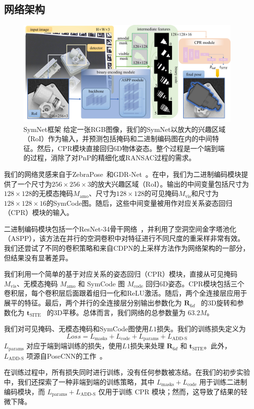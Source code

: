 \subsection{网络架构}
\begin{figure}[t]
    \centerline{\includegraphics[width=1.0\textwidth]{figure/symnet/network.jpg}}
    \caption{SymNet框架 给定一张RGB图像，我们的SymNet以放大的兴趣区域（RoI）作为输入，并预测包括掩码和二进制编码图在内的中间特征。然后，CPR模块直接回归6D物体姿态。整个过程是一个端到端的过程，消除了对PnP的精细化或RANSAC过程的需求。}
    \label{fig:network}
\end{figure}

我们的网络灵感来自于ZebraPose~\cite{su2022zebrapose}和GDR-Net~\cite{wang2021gdr}。在中，我们为二进制编码模块提供了一个尺寸为$256 \times 256 \times 3$的放大兴趣区域（RoI）。输出的中间变量包括尺寸为$128 \times 128$的无模态掩码$M_{\text{amo}}$、尺寸为$128 \times 128$的可见掩码$M_\text{{vis}}$和尺寸为$128 \times 128 \times 16$的SymCode图。随后，这些中间变量被用作对应关系姿态回归（CPR）模块的输入。

二进制编码模块包括一个ResNet-34骨干网络~\cite{he2016resnet}，并利用了空洞空间金字塔池化（ASPP）\cite{chen2017deeplabv3}，该方法在并行的空洞卷积中对特征进行不同尺度的重采样非常有效。我们还尝试了不同的卷积策略和来自CDPN\cite{li2019cdpn}的上采样方法作为网络架构的一部分，但结果没有显著差异。

我们利用一个简单的基于对应关系的姿态回归（CPR）模块，直接从可见掩码 $M_\text{{vis}}$、无模态掩码 $M_{\text{amo}}$ 和 SymCode 图 $M_\text{code}$ 回归6D姿态。CPR模块包括三个卷积层，每个卷积层后面跟着组归一化和ReLU激活。随后，两个全连接层应用于展平的特征。最后，两个并行的全连接层分别输出参数化为 $\mathbf{R}_{6d}$~\cite{zhou2019continuity} 的3D旋转和参数化为 $\mathbf{t}_\text{SITE}$~\cite{li2019cdpn} 的3D平移。总体而言，我们网络的总参数量为 $63.2M$。

我们对可见掩码、无模态掩码和SymCode图使用$L1$损失。我们的训练损失定义为
\begin{equation}
    Loss = L_\text{masks} + L_\text{code} + L_\text{params} + L_\text{ADD-S}
\end{equation}
$L_\text{params}$ 对应于端到端训练的损失，使用$L1$损失来处理 $\mathbf{R}_{6d}$ 和 $\mathbf{t}_\text{SITE}$。此外，$L_\text{ADD-S}$ 项源自PoseCNN的工作~\cite{xiang2018posecnn}。

在训练过程中，所有损失同时进行训练，没有任何参数被冻结。在我们的初步实验中，我们还探索了一种非端到端的训练策略，其中 $L_\text{masks} + L_\text{code}$ 用于训练二进制编码模块，而 $L_\text{params} + L_\text{ADD-S}$ 仅用于训练 CPR 模块；然而，这导致了结果的轻微下降。

